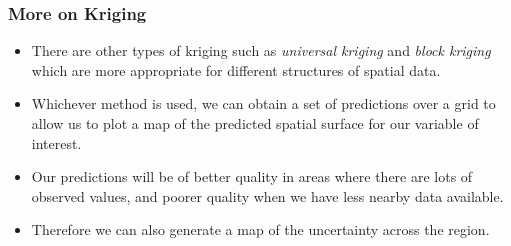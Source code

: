 \documentclass[parskip,12pt]{beamer}
\begin{document}
\begin{frame}
\frametitle{More on Kriging}
 \begin{itemize}
\item There are other types of kriging such as \emph{universal kriging} and \emph{block kriging} which are more appropriate for different structures of spatial data.
\vspace{3mm}
\item Whichever method is used, we can obtain a set of predictions over a grid to allow us to plot a map of the predicted spatial surface for our variable of interest.
\vspace{3mm}
\item Our predictions will be of better quality in areas where there are lots of observed values, and poorer quality when we have less nearby data available.
\vspace{3mm}
\item Therefore we can also generate a map of the uncertainty across the region. 
\end{itemize}
\end{frame}
\end{document}

